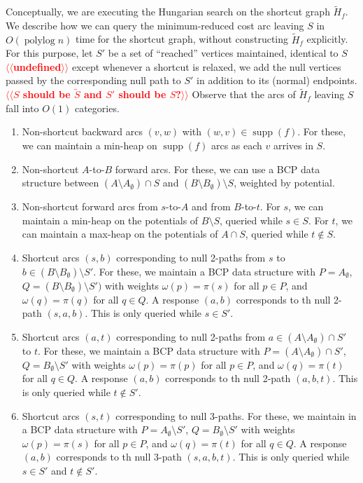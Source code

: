\documentclass[a4paper,UKenglish]{socg-lipics-v2018}
\makeatletter
\def\note#1{\textcolor{red}{{#1}}}
\def\polylog{\mathop{\mathrm{polylog}}}
\def\supp{\operatorname{supp}}
\theoremstyle{plain}
\numberwithin{figure}{section}
\def\EMPH#1{\textbf{\emph{\boldmath #1}}}
\def\n@te#1{\textsf{\boldmath \textbf{$\langle\!\langle$#1$\rangle\!\rangle$}}\leavevmode}
\def\note#1{\textcolor{red}{\n@te{#1}}}
\makeatother
\begin{document}
Conceptually, we are executing the Hungarian search
on the shortcut graph $\tilde{H}_f$.
We describe how we can query the minimum-reduced cost arc leaving $S$ in
$O(\polylog n)$ time for the shortcut graph, without constructing
$\tilde{H}_f$ explicitly.
For this purpose, let \EMPH{$S'$} be a set of ``reached'' vertices maintained,
identical to $S$ \note{undefined} except whenever a shortcut is relaxed, we add the null vertices passed by the corresponding null path to $S'$ in addition to its (normal) endpoints. \note{$S$ should be $\tilde{S}$ and $S'$ should be $S$?}
%
Observe that the arcs of $\tilde{H}_f$ leaving $S$ fall into $O(1)$ categories.
\begin{enumerate}
\item Non-shortcut backward arcs $(v, w)$ with $(w, v) \in \supp(f)$.
	For these, we can maintain a min-heap on $\supp(f)$ arcs as each $v$
	arrives in $S$.
\item Non-shortcut $A$-to-$B$ forward arcs.
	For these, we can use a BCP data structure between
	$(A \setminus A_\emptyset) \cap S$ and
	$(B \setminus B_\emptyset) \setminus S$, weighted by potential.
\item Non-shortcut forward arcs from $s$-to-$A$ and from $B$-to-$t$.
	For $s$, we can maintain a min-heap on the potentials of
	$B \setminus S$, queried while $s \in S$.
	For $t$, we can maintain a max-heap on the potentials of
	$A \cap S$, queried while $t \not\in S$.

\item Shortcut arcs $(s, b)$ corresponding to null 2-paths from $s$ to
	$b \in (B \setminus B_\emptyset) \setminus S'$.
	For these, we maintain a BCP data structure with $P = A_\emptyset$,
	$Q = (B \setminus B_\emptyset) \setminus S')$ with weights
	$\omega(p) = \pi(s)$ for all $p \in P$, and $\omega(q) = \pi(q)$ for
	all $q \in Q$.
	A response $(a, b)$ corresponds to th null 2-path $(s, a, b)$.
	This is only queried while $s \in S'$.
\item Shortcut arcs $(a, t)$ corresponding to null 2-paths from
	$a \in (A \setminus A_\emptyset) \cap S'$ to $t$.
	For these, we maintain a BCP data structure with
	$P = (A \setminus A_\emptyset) \cap S'$,
	$Q = B_\emptyset \setminus S'$ with weights $\omega(p) = \pi(p)$ for
	all $p \in P$, and $\omega(q) = \pi(t)$ for all $q \in Q$.
	A response $(a, b)$ corresponds to th null 2-path $(a, b, t)$.
	This is only queried while $t \not\in S'$.
\item Shortcut arcs $(s, t)$ corresponding to null 3-paths.
	For these, we maintain in a BCP data structure with
	$P = A_\emptyset \setminus S'$, $Q = B_\emptyset \setminus S'$ with
	weights $\omega(p) = \pi(s)$ for all
	$p \in P$, and $\omega(q) = \pi(t)$ for all $q \in Q$.
	A response $(a, b)$ corresponds to th null 3-path $(s, a, b, t)$.
	This is only queried while $s \in S'$ and $t \not\in S'$.
\end{enumerate}
\end{document}
